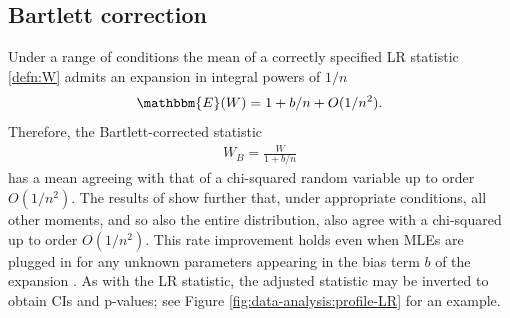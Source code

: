 \documentclass[12pt]{article}
\newcommand{\E}{\mathbbm{E}}
\newcommand{\n}{n}
\newcommand{\W}{W}
\newcommand{\WB}{W_B}
\begin{document}
\subsection{Bartlett correction}

Under a range of conditions the mean of a correctly specified LR statistic \eqref{defn:W} admits an expansion in integral powers of $1/\n$ \citep{barndorff:84}
\begin{align}
  \E(\W)  = 1 + b/\n + O(1/\n^2).
\end{align}
Therefore, the Bartlett-corrected statistic
\begin{align}
  \WB = \frac{\W}{1+b/\n}
  \label{defn:WB}
\end{align}
has a mean agreeing with that of a chi-squared random variable up to order $O(1/\n^2)$.
The results of \citet{bartlett:37,lawley:56} show further that, under
appropriate conditions, all other moments, and so also the entire
distribution, also agree with a chi-squared up to order
$O(1/\n^2)$. This rate improvement holds even when  MLEs are plugged in for any unknown parameters appearing in the  bias term $b$ of the expansion \citep{barndorff:88}.
As with the LR statistic, the
adjusted statistic may be inverted to obtain CIs and
p-values; see Figure \ref{fig:data-analysis:profile-LR} for an example. %
\end{document}
